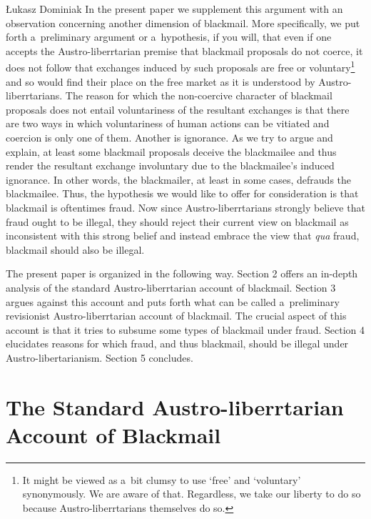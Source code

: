 \begin{artengenv}{Łukasz Dominiak}
In the present paper we supplement this argument with an observation concerning another dimension of blackmail. More specifically, we put forth a~preliminary argument or a~hypothesis, if you will, that even if one accepts the Austro-liberrtarian premise that blackmail proposals do not coerce, it does not follow that exchanges induced by such proposals are free or voluntary\footnote{It might be viewed as a~bit clumsy to use ‘free' and ‘voluntary' synonymously. We are aware of that. Regardless, we take our liberty to do so because Austro-liberrtarians themselves do so. } and so would find their place on the free market as it is understood by Austro-liberrtarians. The reason for which the non-coercive character of blackmail proposals does not entail voluntariness of the resultant exchanges is that there are two ways in which voluntariness of human actions can be vitiated and coercion is only one of them. Another is ignorance. As we try to argue and explain, at least some blackmail proposals deceive the blackmailee and thus render the resultant exchange involuntary due to the blackmailee's induced ignorance. In other words, the blackmailer, at least in some cases, defrauds the blackmailee. Thus, the hypothesis we would like to offer for consideration is that blackmail is oftentimes fraud. Now since Austro-liberrtarians strongly believe that fraud ought to be illegal, they should reject their current view on blackmail as inconsistent with this strong belief and instead embrace the view that \textit{qua} fraud, blackmail should also be illegal.



The present paper is organized in the following way. Section 2 offers an in-depth analysis of the standard Austro-liberrtarian account of blackmail. Section 3 argues against this account and puts forth what can be called a~preliminary revisionist Austro-liberrtarian account of blackmail. The crucial aspect of this account is that it tries to subsume some types of blackmail under fraud. Section 4 elucidates reasons for which fraud, and thus blackmail, should be illegal under Austro-libertarianism. Section 5 concludes.



\section{The Standard Austro-liberrtarian Account of Blackmail}


\end{artengenv}
